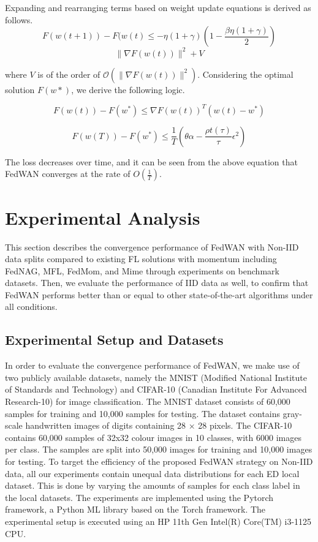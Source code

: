 \documentclass[journal]{IEEEtran}
\begin{document}
Expanding and rearranging terms based on weight update equations is derived as follows.
\[F(w(t+1)) - F(w(t) \leq -\eta(1+\gamma)\left(1 -\frac{\beta\eta(1+\gamma)}{2}\right)\] \[\|\nabla F(w(t))\|^2 + V\]

where $V$ is of the order of $\mathcal{O}(\|\nabla F(w(t))\|^2)$. Considering the optimal solution $F(w*)$, we derive the following logic.

\[F(w(t)) - F(w^*) \leq \nabla F(w(t))^T (w(t) - w^*)\]

\[F(w(T)) - F(w^*) \leq \frac{1}{T} \left( \theta \alpha - \frac{\rho t(\tau)}{\tau} \epsilon^2 \right)\]

The loss decreases over time, and it can be seen from the above equation that FedWAN converges at the rate of $O(\frac{1}{T})$. 

\section{Experimental Analysis}
This section describes the convergence performance of FedWAN with Non-IID data splits compared to existing FL solutions with momentum including FedNAG, MFL, FedMom, and Mime through experiments on benchmark datasets. Then, we evaluate the performance of IID data as well, to confirm that FedWAN performs better than or equal to other state-of-the-art algorithms under all conditions.


\subsection{Experimental Setup and Datasets}
In order to evaluate the convergence performance of FedWAN, we make use of two publicly available datasets, namely the MNIST (Modified National Institute of Standards and Technology) and CIFAR-10 (Canadian Institute For Advanced Research-10) for image classification. The MNIST dataset consists of 60,000 samples for training and 10,000 samples for testing. The dataset contains gray-scale handwritten images of digits containing 28 × 28 pixels. The CIFAR-10 contains 60,000 samples of 32x32 colour images in 10 classes, with 6000 images per class. The samples are split into 50,000 images for training and 10,000 images for testing. To target the efficiency of the proposed FedWAN strategy on Non-IID data, all our experiments contain unequal data distributions for each ED local dataset. This is done by varying the amounts of samples for each class label in the local datasets. The experiments are implemented using the Pytorch framework, a Python ML library based on the Torch framework. The experimental setup is executed using an HP 11th Gen Intel(R) Core(TM) i3-1125 CPU.
\end{document}
